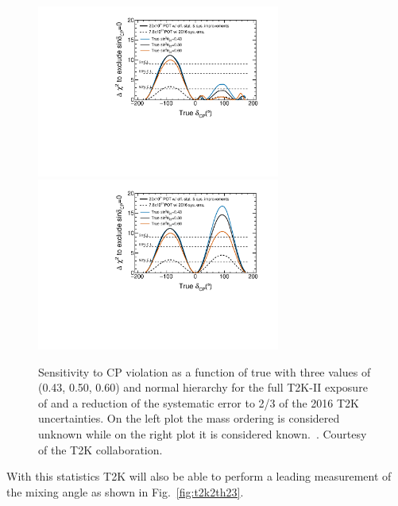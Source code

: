 \begin{figure} [htbp!]
\begin{center}
\includegraphics[width=8cm]{figures/t2kpre_dcp_point1_100k4check_100ksensi_wreactorthrow_optv2s13off_truedcp_unknownMH_fakesyst_lohidcpExclusive.pdf}
\includegraphics[width=8cm]{figures/t2kpre_dcp_point1_100k4check_100ksensi_wreactorthrow_optv2s13off_truedcp_fakesyst_lohidcpExclusive.pdf}
\caption{\label{fig:t2k2sensi} Sensitivity to CP violation as a function of true
\dcp with three values of \stt (0.43, 0.50, 0.60) and normal hierarchy for the full T2K-II exposure of \twopott and a reduction of the systematic error to 2/3 of the 2016 T2K uncertainties. On the left plot the mass ordering is considered unknown while on the right plot it is considered known.~\cite{Abe:2016tez}. Courtesy of the T2K collaboration.}
\end{center}
\end{figure}

With this statistics T2K will also be able to perform a leading measurement of the \stt mixing angle as shown in Fig.~\ref{fig:t2k2th23}.

